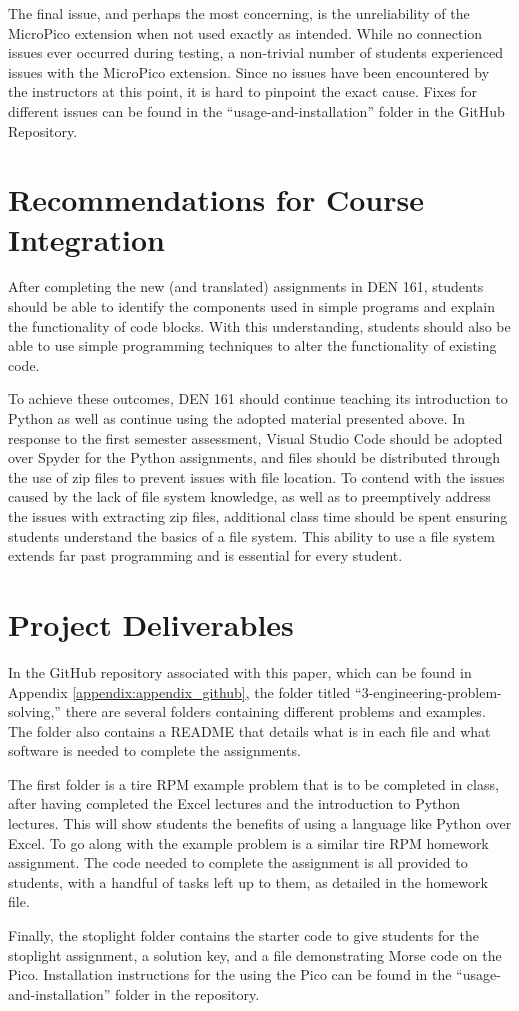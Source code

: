 The final issue, and perhaps the most concerning, is the unreliability of the MicroPico extension when not used 
exactly as intended. While no connection issues ever occurred during testing, a non-trivial number of students
experienced issues with the MicroPico extension. Since no issues have been encountered by the instructors at this
point, it is hard to pinpoint the exact cause. Fixes for different issues can be found in the 
``usage-and-installation'' folder in the GitHub Repository.

\section{Recommendations for Course Integration}

After completing the new (and translated) assignments in DEN 161, students should be able to identify the components 
used in simple programs and explain the functionality of code blocks. With this understanding, students should also 
be able to use simple programming techniques to alter the functionality of existing code. 

To achieve these outcomes, DEN 161 should continue teaching its introduction to Python as well as continue
using the adopted material presented above. In response to the first semester assessment, Visual Studio
Code should be adopted over Spyder for the Python assignments, and files should be distributed through
the use of zip files to prevent issues with file location. To contend with the issues caused by the lack
of file system knowledge, as well as to preemptively address the issues with extracting zip files, additional
class time should be spent ensuring students understand the basics of a file system. This ability to use
a file system extends far past programming and is essential for every student.

\section{Project Deliverables}

In the GitHub repository associated with this paper, which can be found in Appendix \ref{appendix:appendix_github},
the folder titled ``3-engineering-problem-solving,'' there are several folders containing different problems and 
examples. The folder also contains a README that details what is in each file and what software is needed to 
complete the assignments. 

The first folder is a tire RPM example problem that is to be completed in class, after having completed the Excel
lectures and the introduction to Python lectures. This will show students the benefits of using a
language like Python over Excel. To go along with the example problem is a similar tire RPM homework assignment.
The code needed to complete the assignment is all provided to students, with a handful of tasks left up to them,
as detailed in the homework file. 

Finally, the stoplight folder contains the starter code to give students for the stoplight assignment, a solution
key, and a file demonstrating Morse code on the Pico. Installation instructions for the using the Pico can be found
in the ``usage-and-installation'' folder in the repository.
